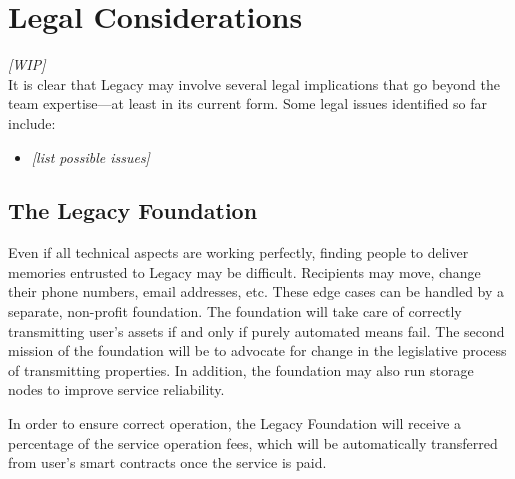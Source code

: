 \chapter{Legal Considerations} %
\label{cha:legal_considerations}

\textit{[WIP]}
\\
It is clear that Legacy may involve several legal implications that go beyond the team expertise---at least in its current form. Some legal issues identified so far include:

\begin{itemize}
	\item \textit{[list possible issues]}
\end{itemize}


\section{The Legacy Foundation} %
\label{sec:the_legacy_foundation}

Even if all technical aspects are working perfectly, finding people to deliver memories entrusted to Legacy may be difficult. Recipients may move, change their phone numbers, email addresses, etc. These edge cases can be handled by a separate, non-profit foundation.
The foundation will take care of correctly transmitting user’s assets if and only if purely automated means fail. 
The second mission of the foundation will be to advocate for change in the legislative process of transmitting properties.
In addition, the foundation may also run storage nodes to improve service reliability.

In order to ensure correct operation, the Legacy Foundation will receive a percentage of the service operation fees, which will be automatically transferred from user’s smart contracts once the service is paid.



